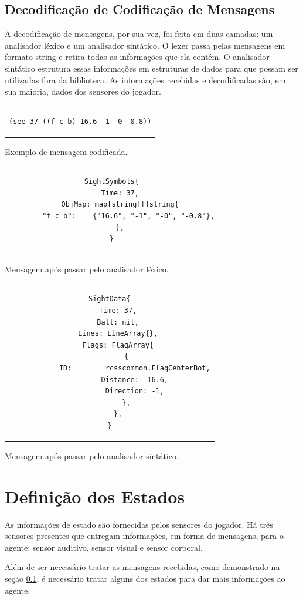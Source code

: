 \subsection{Decodificação de Codificação de Mensagens}
\label{sec:messsages}
A decodificação de mensagens, por sua vez, foi feita em duas camadas: um analisador léxico e um analisador sintático. O lexer passa pelas mensagens em formato string e retira todas as informações que ela contém. O analisador sintático estrutura essas informações em estruturas de dados para que possam ser utilizadas fora da biblioteca. As informações recebidas e decodificadas são, em sua maioria, dados dos sensores do jogador.
\begin{center}



\begin{tabular}{c}
\begin{lstlisting}
(see 37 ((f c b) 16.6 -1 -0 -0.8))
\end{lstlisting}
\end{tabular}

Exemplo de mensagem codificada.


\begin{tabular}{c}
\begin{lstlisting}
SightSymbols{
	Time: 37,
	ObjMap: map[string][]string{
		"f c b":    {"16.6", "-1", "-0", "-0.8"},
	},
}
\end{lstlisting}
\end{tabular}

Mensagem após passar pelo analisador léxico.



\begin{tabular}{c}
\begin{lstlisting}
SightData{
	Time: 37,
	Ball: nil,
	Lines: LineArray{},
	Flags: FlagArray{
		{
			ID:        rcsscommon.FlagCenterBot,
			Distance:  16.6,
			Direction: -1,
		},
	},
}
\end{lstlisting}
\end{tabular}

Mensagem após passar pelo analisador sintático.

\end{center}

\section{Definição dos Estados}
\par As informações de estado são fornecidas pelos sensores do jogador. Há três sensores presentes que entregam informações, em forma de mensagens, para o agente: sensor auditivo, sensor visual e sensor corporal.
\par Além de ser necessário tratar as mensagens recebidas, como demonstrado na seção \ref{sec:messsages}, é necessário tratar alguns dos estados para dar mais informações ao agente. 

